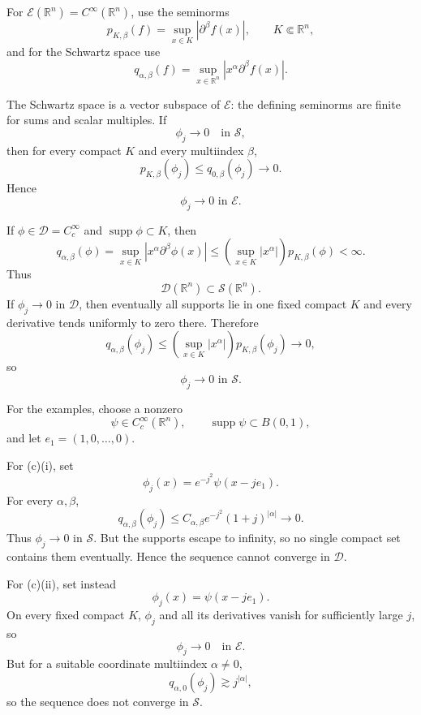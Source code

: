 \begin{solution}
For \(\mathcal E(\mathbb R^n)=C^\infty(\mathbb R^n)\), use the seminorms
\[
p_{K,\beta}(f)=\sup_{x\in K}|\partial^\beta f(x)|,
\qquad K\Subset\mathbb R^n,
\]
and for the Schwartz space use
\[
q_{\alpha,\beta}(f)
=
\sup_{x\in\mathbb R^n}
|x^\alpha\partial^\beta f(x)|.
\]

The Schwartz space is a vector subspace of \(\mathcal E\): the defining seminorms are finite for sums and scalar multiples. If
\[
\phi_j\longrightarrow0
\quad\text{in }\mathcal S,
\]
then for every compact \(K\) and every multiindex \(\beta\),
\[
p_{K,\beta}(\phi_j)
\le
q_{0,\beta}(\phi_j)
\longrightarrow0.
\]
Hence
\[
\boxed{\phi_j\to0\text{ in }\mathcal E.}
\]

If \(\phi\in\mathcal D=C_c^\infty\) and
\(\operatorname{supp}\phi\subset K\), then
\[
q_{\alpha,\beta}(\phi)
=
\sup_{x\in K}|x^\alpha\partial^\beta\phi(x)|
\le
\left(\sup_{x\in K}|x^\alpha|\right)
p_{K,\beta}(\phi)<\infty.
\]
Thus
\[
\mathcal D(\mathbb R^n)\subset\mathcal S(\mathbb R^n).
\]
If \(\phi_j\to0\) in \(\mathcal D\), then eventually all supports lie in one fixed compact \(K\) and every derivative tends uniformly to zero there. Therefore
\[
q_{\alpha,\beta}(\phi_j)
\le
\left(\sup_{x\in K}|x^\alpha|\right)
p_{K,\beta}(\phi_j)
\longrightarrow0,
\]
so
\[
\boxed{\phi_j\to0\text{ in }\mathcal S.}
\]

For the examples, choose a nonzero
\[
\psi\in C_c^\infty(\mathbb R^n),
\qquad
\operatorname{supp}\psi\subset B(0,1),
\]
and let \(e_1=(1,0,\ldots,0)\).

For (c)(i), set
\[
\phi_j(x)=e^{-j^2}\psi(x-je_1).
\]
For every \(\alpha,\beta\),
\[
q_{\alpha,\beta}(\phi_j)
\le
C_{\alpha,\beta}
e^{-j^2}(1+j)^{|\alpha|}
\longrightarrow0.
\]
Thus \(\phi_j\to0\) in \(\mathcal S\). But the supports escape to infinity, so no single compact set contains them eventually. Hence the sequence cannot converge in \(\mathcal D\).

For (c)(ii), set instead
\[
\phi_j(x)=\psi(x-je_1).
\]
On every fixed compact \(K\), \(\phi_j\) and all its derivatives vanish for sufficiently large \(j\), so
\[
\phi_j\to0\quad\text{in }\mathcal E.
\]
But for a suitable coordinate multiindex \(\alpha\neq0\),
\[
q_{\alpha,0}(\phi_j)\gtrsim j^{|\alpha|},
\]
so the sequence does not converge in \(\mathcal S\).
\end{solution}


